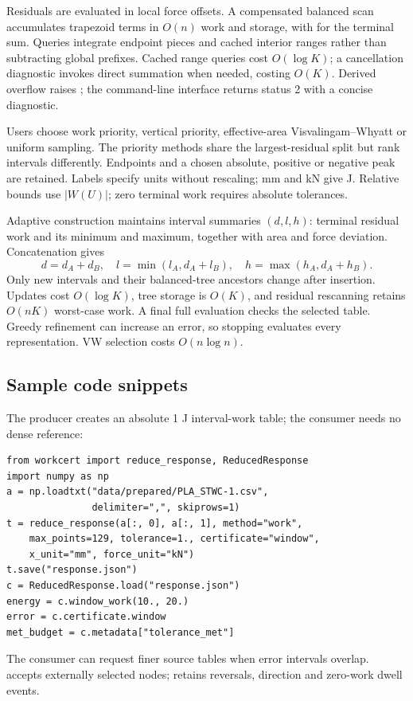 \documentclass[preprint,12pt,a4paper]{elsarticle}
\begin{document}
Residuals are evaluated in local force offsets. A compensated balanced scan accumulates trapezoid terms in $O(n)$ work and storage, with  for the terminal sum. Queries integrate endpoint pieces and cached interior ranges rather than subtracting global prefixes. Cached range queries cost $O(\log K)$; a cancellation diagnostic invokes direct summation when needed, costing $O(K)$. Derived overflow raises ; the command-line interface returns status 2 with a concise diagnostic.

Users choose work priority, vertical priority, effective-area Visvalingam--Whyatt or uniform sampling. The priority methods share the largest-residual split but rank intervals differently. Endpoints and a chosen absolute, positive or negative peak are retained. Labels specify units without rescaling; mm and kN give J. Relative bounds use $|W(U)|$; zero terminal work requires absolute tolerances.

Adaptive construction maintains interval summaries $(d,l,h)$: terminal residual work and its minimum and maximum, together with area and force deviation. Concatenation gives
\begin{equation}
d=d_A+d_B,\quad l=\min(l_A,d_A+l_B),\quad h=\max(h_A,d_A+h_B).
\end{equation}
Only new intervals and their balanced-tree ancestors change after insertion. Updates cost $O(\log K)$, tree storage is $O(K)$, and residual rescanning retains $O(nK)$ worst-case work. A final full evaluation checks the selected table. Greedy refinement can increase an error, so stopping evaluates every representation. VW selection costs $O(n\log n)$.

\begin{minipage}{\linewidth}
\subsection{Sample code snippets}
The producer creates an absolute 1 J interval-work table; the consumer needs no dense reference:
\begin{verbatim}
from workcert import reduce_response, ReducedResponse
import numpy as np
a = np.loadtxt("data/prepared/PLA_STWC-1.csv",
               delimiter=",", skiprows=1)
t = reduce_response(a[:, 0], a[:, 1], method="work",
    max_points=129, tolerance=1., certificate="window",
    x_unit="mm", force_unit="kN")
t.save("response.json")
c = ReducedResponse.load("response.json")
energy = c.window_work(10., 20.)
error = c.certificate.window
met_budget = c.metadata["tolerance_met"]
\end{verbatim}
\end{minipage}
The consumer can request finer source tables when error intervals overlap.  accepts externally selected nodes;  retains reversals, direction and zero-work dwell events.
\end{document}
